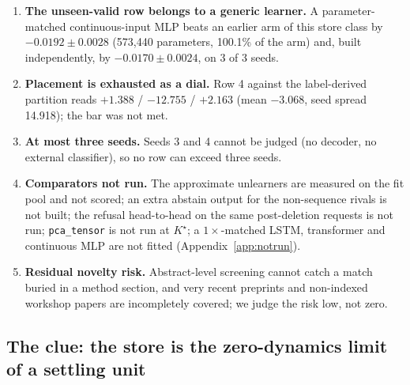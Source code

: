 \documentclass{article} %
\newcommand{\Kstar}{\ensuremath{K^{\star}}}
\begin{document}
\begin{enumerate}[leftmargin=*,itemsep=1pt]
  A ridge probe on the same observation at $t=0$ scores AUC 0.48--0.55 across all six seed and
  tier runs: deciding solvability within budget is close to solving the maze, a property of the
  task rather than a defect of the model. %
  The Shapes3D coupling hole is a different object in a different environment and is untouched.
\item \textbf{The unseen-valid row belongs to a generic learner.} A parameter-matched
  continuous-input MLP beats an earlier arm of this store class by $-0.0192\pm0.0028$ (573,440
  parameters, 100.1\% of the arm) and, built independently, by $-0.0170\pm0.0024$, on 3 of 3
  seeds. %
\item \textbf{Placement is exhausted as a dial.} Row 4 against the label-derived partition reads
  $+1.388$ / $-12.755$ / $+2.163$ (mean $-3.068$, seed spread 14.918); the bar was not met.
\item \textbf{At most three seeds.} Seeds 3 and 4 cannot be judged (no decoder, no external
  classifier), so no row can exceed three seeds.
\item \textbf{Comparators not run.} The approximate unlearners are measured on the fit pool and
  not scored; an extra abstain output for the non-sequence rivals is not built; the refusal
  head-to-head on the same post-deletion requests is not run; \texttt{pca\_tensor} is not run at
  $\Kstar$; a $1\times$-matched LSTM, transformer and continuous MLP are not fitted
  (Appendix~\ref{app:notrun}).
\item \textbf{Residual novelty risk.} Abstract-level screening cannot catch a match buried in a
  method section, and very recent preprints and non-indexed workshop papers are incompletely
  covered; we judge the risk low, not zero. %
\end{enumerate}

\subsection{The clue: the store is the zero-dynamics limit of a settling unit}
\label{sec:clue}
\end{document}
